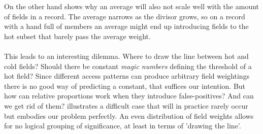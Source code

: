On the other hand  shows why an average will also not scale well with the amount of fields in a record. The average narrows as the divisor grows, so on a record with a hand full of members an average might end up introducing fields to the hot subset that barely pass the average weight.\\\\
This leads to an interesting dilemma. Where to draw the line between hot and cold fields? Should there be constant \textit{magic numbers} defining the threshold of a hot field? Since different access patterns can produce arbitrary field weightings there is no good way of predicting a constant, that suffices our intention. But how can relative proportions work when they introduce false-positives? And can we get rid of them?  illustrates a difficult case that will in practice rarely occur but embodies our problem perfectly. An even distribution of field weights allows for no logical grouping of significance, at least in terms of 'drawing the line'.
